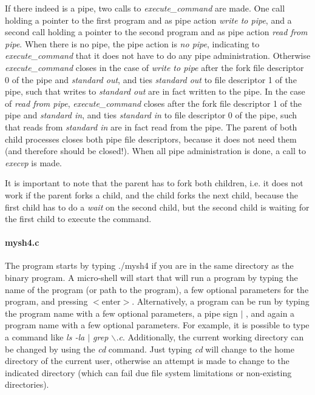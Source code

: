 \documentclass[a4paper,10pt]{article}
\begin{document}
If there indeed is a pipe, two calls to \emph{execute\_command} are made. One call holding a pointer to the first program and as pipe action \emph{write to pipe}, and a second call holding a pointer to the second program and as pipe action \emph{read from pipe}. When there is no pipe, the pipe action is \emph{no pipe}, indicating to \emph{execute\_command} that it does not have to do any pipe administration. Otherwise \emph{execute\_command} closes in the case of \emph{write to pipe} after the fork file descriptor 0 of the pipe and \emph{standard out}, and ties \emph{standard out} to file descriptor 1 of the pipe, such that writes to \emph{standard out} are in fact written to the pipe. In the case of \emph{read from pipe}, \emph{execute\_command} closes after the fork file descriptor 1 of the pipe and \emph{standard in}, and ties \emph{standard in} to file descriptor 0 of the pipe, such that reads from \emph{standard in} are in fact read from the pipe. The parent of both child processes closes both pipe file descriptors, because it does not need them (and therefore should be closed!). When all pipe administration is done, a call to \emph{execvp} is made.

It is important to note that the parent has to fork both children, i.e. it does not work if the parent forks a child, and the child forks the next child, because the first child has to do a \emph{wait} on the second child, but the second child is waiting for the first child to execute the command.

\paragraph{mysh4.c} The program starts by typing ./mysh4 if you are in the same directory as the binary program. A micro-shell will start that will run a program by typing the name of the program (or path to the program), a few optional parameters for the program, and pressing $<$enter$>$. Alternatively, a program can be run by typing the program name with a few optional parameters, a pipe sign $\mid$ , and again a program name with a few optional parameters. For example, it is possible to type a command like \emph{ls -la $\mid$ grep $\backslash$.c}. Additionally, the current working directory can be changed by using the \emph{cd} command. Just typing \emph{cd} will change to the home directory of the current user, otherwise an attempt is made to change to the indicated directory (which can fail due file system limitations or non-existing directories).
\end{document}
